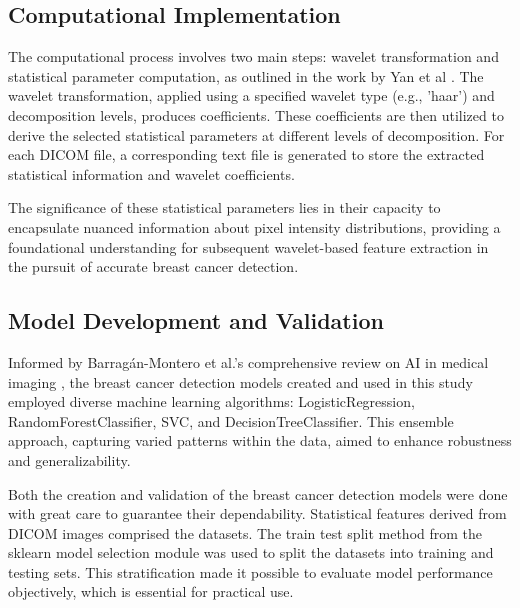 \subsection{Computational Implementation}
The computational process involves two main steps: wavelet transformation and statistical parameter computation, as outlined in the work by Yan et al \cite{YAN2006285}. The wavelet transformation, applied using a specified wavelet type (e.g., 'haar') and decomposition levels, produces coefficients. These coefficients are then utilized to derive the selected statistical parameters at different levels of decomposition. For each DICOM file, a corresponding text file is generated to store the extracted statistical information and wavelet coefficients.

The significance of these statistical parameters lies in their capacity to encapsulate nuanced information about pixel intensity distributions, providing a foundational understanding for subsequent wavelet-based feature extraction in the pursuit of accurate breast cancer detection.

\subsection{Model Development and Validation}
Informed by Barragán-Montero et al.'s comprehensive review on AI in medical imaging \cite{barragan2021artificial}, the breast cancer detection models created and used in this study employed diverse machine learning algorithms: LogisticRegression, RandomForestClassifier, SVC, and DecisionTreeClassifier. This ensemble approach, capturing varied patterns within the data, aimed to enhance robustness and generalizability.

Both the creation and validation of the breast cancer detection models were done with great care to guarantee their dependability. Statistical features derived from DICOM images comprised the datasets. The train test split method from the sklearn model selection module was used to split the datasets into training and testing sets. This stratification made it possible to evaluate model performance objectively, which is essential for practical use.